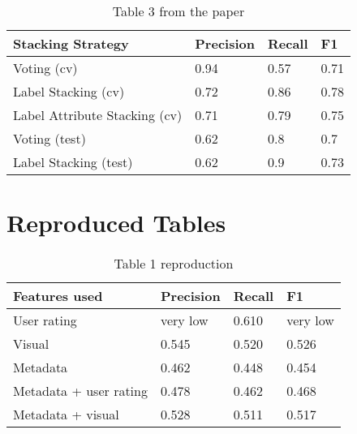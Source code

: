 \documentclass[sigconf]{acmart}
\begin{document}
\begin{table}[hbt!]
\caption*{Table 3 from the paper}
\begin{tabular}{llll}
\hline
Stacking Strategy             & Precision & Recall & F1   \\ \hline
Voting (cv)                   & 0.94      & 0.57   & 0.71 \\
Label Stacking (cv)           & 0.72      & 0.86   & 0.78 \\
Label Attribute Stacking (cv) & 0.71      & 0.79   & 0.75 \\
Voting (test)                 & 0.62      & 0.8    & 0.7  \\
Label Stacking (test)         & 0.62      & 0.9    & 0.73 \\ \hline
\end{tabular}
\end{table}

\newpage
\section{Reproduced Tables}
\begin{table}[hbt!]
  \caption*{Table 1 reproduction}
\begin{tabular}{llll}
\hline
Features used          & Precision & Recall & F1       \\ \hline
User rating            & very low  & 0.610  & very low \\
Visual                 & 0.545     & 0.520  & 0.526    \\
Metadata               & 0.462     & 0.448  & 0.454    \\
Metadata + user rating & 0.478     & 0.462  & 0.468    \\
Metadata + visual      & 0.528     & 0.511  & 0.517    \\ \hline
\end{tabular} 
\end{table}
\end{document}

